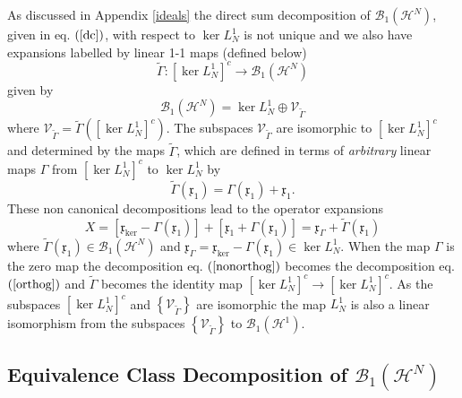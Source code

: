 \documentclass[aps,preprint]{revtex4}%
\begin{document}
As discussed in Appendix \ref{ideals} the direct sum decomposition of
$\mathcal{B}_{1}\left(  \mathcal{H}^{N}\right)  $, given in eq. $\left(
\ref{dc}\right)  $, with respect to $\ker L_{N}^{1}$ is not unique and we also
have expansions labelled by linear 1-1 maps (defined below)
\begin{equation}
\tilde{\Gamma}:\left[  \ker L_{N}^{1}\right]  ^{c}\rightarrow\mathcal{B}%
_{1}\left(  \mathcal{H}^{N}\right)
\end{equation}
given by
\begin{equation}
\mathcal{B}_{1}\left(  \mathcal{H}^{N}\right)  =\ker L_{N}^{1}\oplus
\mathcal{V}_{\tilde{\Gamma}} \label{nonorthog}%
\end{equation}
where $\mathcal{V}_{\tilde{\Gamma}}=\tilde{\Gamma}\left(  \left[  \ker
L_{N}^{1}\right]  ^{c}\right)  $. The subspaces $\mathcal{V}_{\tilde{\Gamma}}$
are isomorphic to $\left[  \ker L_{N}^{1}\right]  ^{c}$ and determined by the
maps $\tilde{\Gamma}$, which are defined in terms of \emph{arbitrary} linear
maps $\Gamma$ from $\left[  \ker L_{N}^{1}\right]  ^{c}$ to $\ker L_{N}^{1}$
by%
\begin{equation}
\tilde{\Gamma}\left(  \mathfrak{x}_{1}\right)  =\Gamma\left(  \mathfrak{x}%
_{1}\right)  +\mathfrak{x}_{1}.
\end{equation}
These non canonical decompositions lead to the operator expansions
\begin{equation}
X=\left[  \mathfrak{x}_{\ker}-\Gamma\left(  \mathfrak{x}_{1}\right)  \right]
+\left[  \mathfrak{x}_{1}+\Gamma\left(  \mathfrak{x}_{1}\right)  \right]
=\mathfrak{x}_{\Gamma}+\tilde{\Gamma}\left(  \mathfrak{x}_{1}\right)
\end{equation}
where $\tilde{\Gamma}\left(  \mathfrak{x}_{1}\right)  \in\mathcal{B}%
_{1}\left(  \mathcal{H}^{N}\right)  $ and $\mathfrak{x}_{\Gamma}%
=\mathfrak{x}_{\ker}-\Gamma\left(  \mathfrak{x}_{1}\right)  \in\ker L_{N}^{1}%
$. When the map $\Gamma$ is the zero map the decomposition eq. $\left(
\ref{nonorthog}\right)  $ becomes the decomposition eq. $\left(
\ref{orthog}\right)  $ and $\tilde{\Gamma}$ becomes the identity map $\left[
\ker L_{N}^{1}\right]  ^{c}\rightarrow\left[  \ker L_{N}^{1}\right]  ^{c}$. As
the subspaces $\left[  \ker L_{N}^{1}\right]  ^{c}$ and $\left\{
\mathcal{V}_{\tilde{\Gamma}}\right\}  $ are isomorphic the map $L_{N}^{1}$ is
also a linear isomorphism from the subspaces $\left\{  \mathcal{V}%
_{\tilde{\Gamma}}\right\}  $ to $\mathcal{B}_{1}\left(  \mathcal{H}%
^{1}\right)  $.

\subsection{Equivalence Class Decomposition of $\mathcal{B}_{1}\left(
\mathcal{H}^{N}\right)  $}
\end{document}
